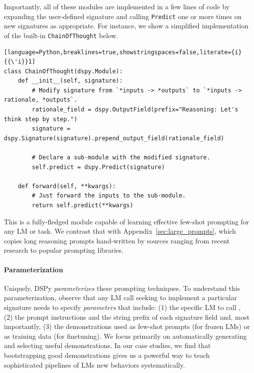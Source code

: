 Importantly, all of these modules are implemented in a few lines of code by expanding the user-defined signature and calling \texttt{Predict} one or more times on new signatures as appropriate. For instance, we show a simplified implementation of the built-in \texttt{ChainOfThought} below.
\begin{samepage}
\begin{lstlisting}[language=Python,breaklines=true,showstringspaces=false,literate={í}{{\'i}}1]
class ChainOfThought(dspy.Module):
    def __init__(self, signature):
        # Modify signature from `*inputs -> *outputs` to `*inputs -> rationale, *outputs`.
        rationale_field = dspy.OutputField(prefix="Reasoning: Let's think step by step.")
        signature = dspy.Signature(signature).prepend_output_field(rationale_field)

        # Declare a sub-module with the modified signature.
        self.predict = dspy.Predict(signature)
    
    def forward(self, **kwargs):
        # Just forward the inputs to the sub-module.
        return self.predict(**kwargs)
\end{lstlisting}
\end{samepage}
This is a fully-fledged module capable of learning effective few-shot prompting for any LM or task. We contrast that with {Appendix~\ref{sec:large_prompts}}, which copies long reasoning prompts hand-written by sources ranging from recent research to popular prompting libraries. %


\vspace{2mm}

 \paragraph{Parameterization}

Uniquely, DSPy \textit{parameterizes} these prompting techniques. To understand this parameterization, observe that any LM call seeking to implement a particular signature needs to specify \textit{parameters} that include: (1) the specific LM to call \citep{chen2023frugalgpt}, (2) the prompt instructions \citep{yang2023large} and the string prefix of each signature field and, most importantly, (3) the demonstrations used as few-shot prompts (for frozen LMs) or as training data (for finetuning). We focus primarily on automatically generating and selecting useful demonstrations. In our case studies, we find that bootstrapping good demonstrations gives us a powerful way to teach sophisticated pipelines of LMs new behaviors systematically. %






